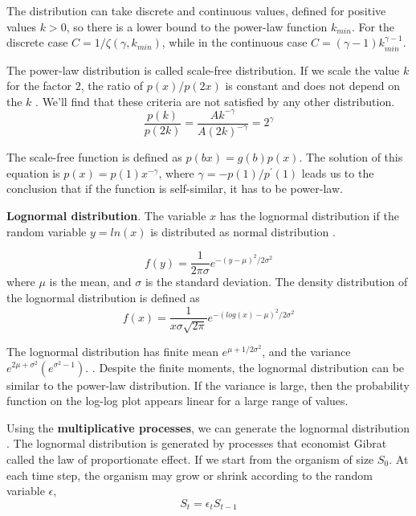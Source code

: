 The distribution can take discrete and continuous values, defined for positive values $k>0$, so there is a lower bound to the power-law function $k_{min}$. For the discrete case $C=1/\zeta(\gamma, k_{min})$, while in the continuous case $C=(\gamma-1)k_{min}^{\gamma-1}$. 

The power-law distribution is called scale-free distribution. If we scale the value $k$ for the factor $2$, the ratio of $p(x)/p(2x)$ is constant and does not depend on the $k$ \cite{caldarelli2007scalefree}. We'll find that these criteria are not satisfied by any other distribution. 
\begin{equation}
\frac{p(k)}{p(2k)} = \frac{Ak^{-\gamma}}{A(2k)^{-\gamma}} = 2^{\gamma}
\end{equation}

The scale-free function is defined as $p(bx) = g(b)p(x)$. The solution of this equation is $p(x)=p(1)x^{-\gamma}$, where  $\gamma=-p(1)/p^{'}(1)$ leads us to the conclusion that if the function is self-similar, it has to be power-law.

\textbf{Lognormal distribution}. The variable $x$ has the lognormal distribution if the random variable $y=ln(x)$ is distributed as normal distribution \cite{limpert2001log}. 

\begin{equation}
f(y) = \frac{1}{2\pi\sigma}e^{-(y-\mu)^2/2\sigma^2}
\end{equation}
where $\mu$ is the mean, and $\sigma$ is the standard deviation. The density distribution of the lognormal distribution is defined as
\begin{equation}
f(x) = \frac{1}{x \sigma \sqrt{2\pi}}e^{-(log(x)-\mu)^2 /2\sigma^2} 
\end{equation}

The lognormal distribution has finite mean $e^{\mu+1/2\sigma^2}$, and the variance $e^{2\mu+\sigma^2}(e^{\sigma^2 -1})$.  \cite{mitzenmacher2004brief}. Despite the finite moments, the lognormal distribution can be similar to the power-law distribution. If the variance is large, then the probability function on the log-log plot appears linear for a large range of values. 

Using the \textbf{multiplicative processes}, we can generate the lognormal distribution \cite{caldarelli2007scalefree, mitzenmacher2004brief}. The lognormal distribution is generated by processes that economist Gibrat called the law of proportionate effect. If we start from the organism of size $S_0$. At each time step, the organism may grow or shrink according to the random variable $\epsilon$, 
\begin{equation}
S_t = \epsilon_t S_{t-1}
\end{equation}

